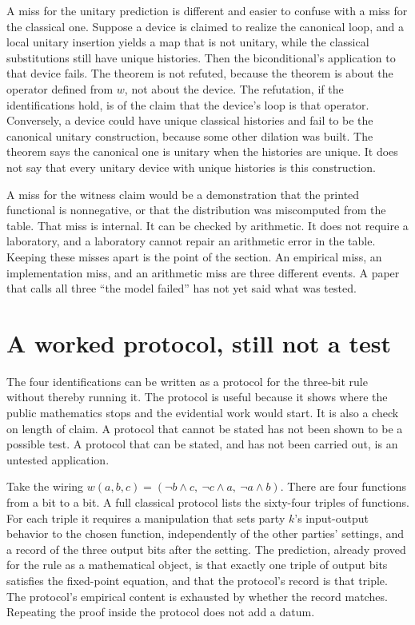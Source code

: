 \documentclass[11pt]{article}
\begin{document}
A miss for the unitary prediction is different and easier to confuse with a miss for the classical one. Suppose a device is claimed to realize the canonical loop, and a local unitary insertion yields a map that is not unitary, while the classical substitutions still have unique histories. Then the biconditional's application to that device fails. The theorem is not refuted, because the theorem is about the operator defined from \(w\), not about the device. The refutation, if the identifications hold, is of the claim that the device's loop is that operator. Conversely, a device could have unique classical histories and fail to be the canonical unitary construction, because some other dilation was built. The theorem says the canonical one is unitary when the histories are unique. It does not say that every unitary device with unique histories is this construction.

A miss for the witness claim would be a demonstration that the printed functional is nonnegative, or that the distribution was miscomputed from the table. That miss is internal. It can be checked by arithmetic. It does not require a laboratory, and a laboratory cannot repair an arithmetic error in the table. Keeping these misses apart is the point of the section. An empirical miss, an implementation miss, and an arithmetic miss are three different events. A paper that calls all three ``the model failed'' has not yet said what was tested.

\section{A worked protocol, still not a test}
\label{sec:protocol}

The four identifications can be written as a protocol for the three-bit rule without thereby running it. The protocol is useful because it shows where the public mathematics stops and the evidential work would start. It is also a check on length of claim. A protocol that cannot be stated has not been shown to be a possible test. A protocol that can be stated, and has not been carried out, is an untested application.

Take the wiring \(w(a,b,c)=(\lnot b\land c,\ \lnot c\land a,\ \lnot a\land b)\). There are four functions from a bit to a bit. A full classical protocol lists the sixty-four triples of functions. For each triple it requires a manipulation that sets party \(k\)'s input-output behavior to the chosen function, independently of the other parties' settings, and a record of the three output bits after the setting. The prediction, already proved for the rule as a mathematical object, is that exactly one triple of output bits satisfies the fixed-point equation, and that the protocol's record is that triple. The protocol's empirical content is exhausted by whether the record matches. Repeating the proof inside the protocol does not add a datum.
\end{document}

